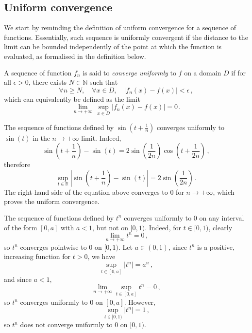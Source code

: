 \subsection{Uniform convergence}
We start by reminding the definition of uniform convergence for a sequence of functions.
Essentially, such sequence is uniformly convergent if the distance to the limit can be
bounded independently of the point at which the function is evaluated, as formalised in
the definition below.
\begin{definition}
  A sequence of function $f_n$ is said to \emph{converge uniformly} to $f$ on a domain $D$
  if for all $\epsilon>0$, there exists $N\in\mathbb{N}$ such that
  \begin{equation}
    \forall n\geq N,\quad\forall x\in D,\quad|f_n(x)-f(x)|<\epsilon\,,
  \end{equation}
  which can equivalently be defined as the limit
  \begin{equation}
    \lim_{n\to+\infty}\,\sup_{x\in D}|f_n(x)-f(x)|=0\,.
  \end{equation}
\end{definition}
\begin{example}
  The sequence of functions defined by $\sin(t+\frac{1}{n})$ converges uniformly to
  $\sin(t)$ in the $n\to+\infty$ limit. Indeed,
  \begin{equation}
    \sin\left(t+\frac{1}{n}\right)-\sin(t)
    =2\sin\left(\frac{1}{2n}\right)\cos\left(t+\frac{1}{2n}\right)\,,
  \end{equation}
  therefore
  \begin{equation}
    \sup_{t\in\mathbb{R}}\left|\sin\left(t+\frac{1}{n}\right)
    -\sin(t)\right|=2\sin\left(\frac{1}{2n}\right)\,.
  \end{equation}
  The right-hand side of the equation above converges to $0$ for $n\to+\infty$, which
  proves the uniform convergence.
\end{example}
\begin{example}
  The sequence of functions defined by $t^n$ converges uniformly to $0$ on any interval of
  the form $[0,a]$ with $a<1$, but not on $[0,1)$. Indeed, for $t\in [0,1)$, clearly
  \begin{equation}
    \lim_{n\to+\infty}t^n=0\,,
  \end{equation}
  so $t^n$ converges pointwise to $0$ on $[0,1)$. Let $a\in(0,1)$, since $t^n$ is a
  positive, increasing function for $t>0$, we have
  \begin{equation}
    \sup_{t\in[0,a]}|t^n|=a^n\,,
  \end{equation}
  and since $a<1$,
  \begin{equation}
    \lim_{n\to+\infty}\sup_{t\in[0,a]}t^n=0\,,
  \end{equation}
  so $t^n$ converges uniformly to $0$ on $[0,a]$. However,
  \begin{equation}
    \sup_{t\in[0,1)}|t^n|=1\,,
  \end{equation}
  so $t^n$ does not converge uniformly to $0$ on $[0,1)$.
\end{example}
